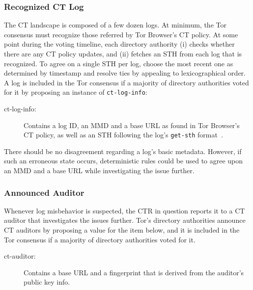 
\subsubsection{Recognized CT Log}
The CT landscape is composed of a few dozen logs.  At minimum, the Tor
consensus must recognize those referred by Tor Browser's CT policy.  At some
point during the voting timeline, each directory authority
(i) checks whether there are any CT policy updates, and
(ii) fetches an STH from each log that is recognized.
To agree on a single STH per log, choose the most recent one as determined by
timestamp and resolve ties by appealing to lexicographical order.  A log is
included in the Tor consensus if a majority of directory authorities voted
for it by proposing an instance of \texttt{ct-log-info}:
\begin{description}
	\item[ct-log-info:] Contains a log ID, an MMD and a base URL as found in
		Tor Browser's CT policy, as well as an STH following the log's
		\texttt{get-sth} format~\cite{ct,ct/bis}.
\end{description}

There should be no disagreement regarding a log's basic metadata.  However, if
such an erroneous state occurs, deterministic rules could be used to agree upon
an MMD and a base URL while investigating the issue further.

\subsubsection{Announced Auditor}
Whenever log misbehavior is suspected, the CTR in question reports it to a
CT auditor that investigates the issues further.  Tor's directory authorities
announce CT auditors by proposing a value for the item below, and it is included
in the Tor consensus if a majority of directory authorities voted for it.
\begin{description}
	\item[ct-auditor:] Contains a base URL and a fingerprint that is derived
		from the auditor's public key info.
\end{description}

